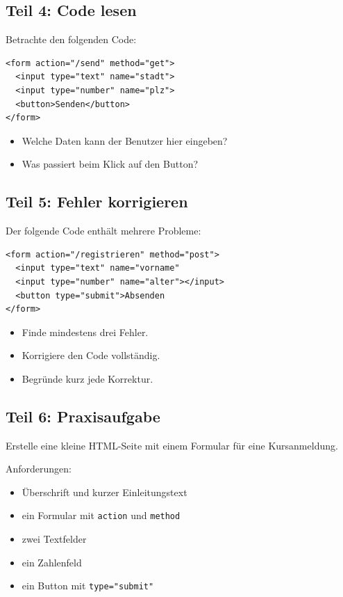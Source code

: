\documentclass[a4paper,12pt]{article}
\begin{document}
\subsection*{Teil 4: Code lesen}
Betrachte den folgenden Code:

\begin{verbatim}
<form action="/send" method="get">
  <input type="text" name="stadt">
  <input type="number" name="plz">
  <button>Senden</button>
</form>
\end{verbatim}

\begin{itemize}
  \item Welche Daten kann der Benutzer hier eingeben?
  \item Was passiert beim Klick auf den Button?
\end{itemize}

\subsection*{Teil 5: Fehler korrigieren}
Der folgende Code enthält mehrere Probleme:

\begin{verbatim}
<form action="/registrieren" method="post">
  <input type="text" name="vorname"
  <input type="number" name="alter"></input>
  <button type="submit">Absenden
</form>
\end{verbatim}

\begin{itemize}
  \item Finde mindestens drei Fehler.
  \item Korrigiere den Code vollständig.
  \item Begründe kurz jede Korrektur.
\end{itemize}

\subsection*{Teil 6: Praxisaufgabe}
Erstelle eine kleine HTML-Seite mit einem Formular für eine Kursanmeldung.

Anforderungen:
\begin{itemize}
  \item Überschrift und kurzer Einleitungstext
  \item ein Formular mit \texttt{action} und \texttt{method}
  \item zwei Textfelder
  \item ein Zahlenfeld
  \item ein Button mit \texttt{type="submit"}
\end{itemize}
\end{document}

